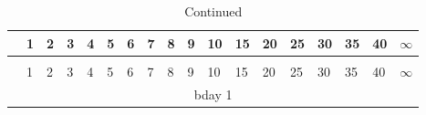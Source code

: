 \begin{longtable}{|p{0.01cm}|p{0.25cm}p{0.25cm}p{0.25cm}p{0.25cm}p{0.25cm}p{0.25cm}p{0.25cm}p{0.25cm}p{0.25cm}p{0.25cm}p{0.25cm}p{0.25cm}p{0.25cm}p{0.25cm}p{0.25cm}p{0.25cm}p{0.25cm}|}
\hline \textbf{} & {\tiny1} & {\tiny2} & {\tiny3} & {\tiny4} & {\tiny5} & {\tiny6} & {\tiny7} & {\tiny8} & {\tiny9} & {\tiny10} & {\tiny15} & {\tiny20} & {\tiny25} & {\tiny30} & {\tiny35} & {\tiny40} & {\tiny$ \infty $} \\
\endfirsthead \caption{Continued}\\
\hline \textbf{} & {\tiny1} & {\tiny2} & {\tiny3} & {\tiny4} & {\tiny5} & {\tiny6} & {\tiny7} & {\tiny8} & {\tiny9} & {\tiny10} & {\tiny15} & {\tiny20} & {\tiny25} & {\tiny30} & {\tiny35} & {\tiny40} & {\tiny$ \infty $} \\
\hline \endhead
\hline\hline \multicolumn{18}{|c|}{\tiny{bday 1}} \\

\end{longtable}
